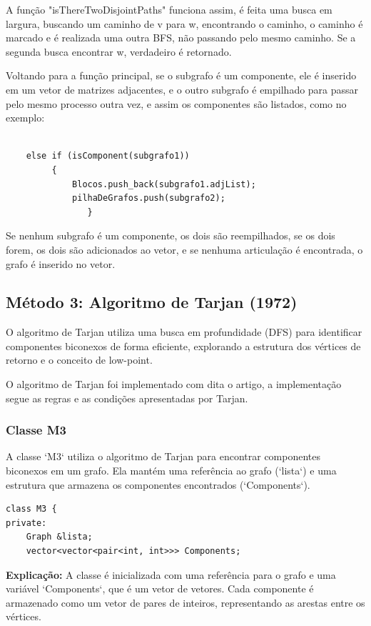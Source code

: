 \documentclass[10pt,conference]{IEEEtran}
\begin{document}
A função "isThereTwoDisjointPaths"  funciona assim, é feita uma busca em largura, buscando um caminho de v para w, encontrando o caminho, o caminho é marcado e é realizada uma outra BFS, não passando pelo mesmo caminho. Se a segunda busca encontrar w, verdadeiro é retornado.

Voltando para a função principal, se o subgrafo é um componente, ele é inserido em um vetor de matrizes adjacentes, e o outro subgrafo é empilhado para passar pelo mesmo processo outra vez, e assim os componentes são listados, como no exemplo:
\begin{lstlisting}
    
    else if (isComponent(subgrafo1))
         { 
             Blocos.push_back(subgrafo1.adjList);
             pilhaDeGrafos.push(subgrafo2); 
                }
\end{lstlisting}
Se nenhum subgrafo é um componente, os dois são reempilhados, se os dois forem, os dois são adicionados ao vetor, e se nenhuma articulação é encontrada, o grafo é inserido no vetor.

\subsection{Método 3: Algoritmo de Tarjan (1972)}
O algoritmo de Tarjan utiliza uma busca em profundidade (DFS) para identificar componentes biconexos de forma eficiente, explorando a estrutura dos vértices de retorno e o conceito de low-point.

O algoritmo de Tarjan\cite{4569669} foi implementado com dita o artigo, a implementação segue as regras e as condições apresentadas por Tarjan.

\subsubsection{Classe M3}

A classe `M3` utiliza o algoritmo de Tarjan para encontrar componentes biconexos em um grafo. Ela mantém uma referência ao grafo (`lista`) e uma estrutura que armazena os componentes encontrados (`Components`).

\begin{lstlisting}
class M3 {
private:
    Graph &lista;
    vector<vector<pair<int, int>>> Components;
\end{lstlisting}

\textbf{Explicação:} A classe é inicializada com uma referência para o grafo e uma variável `Components`, que é um vetor de vetores. Cada componente é armazenado como um vetor de pares de inteiros, representando as arestas entre os vértices.
\end{document}

